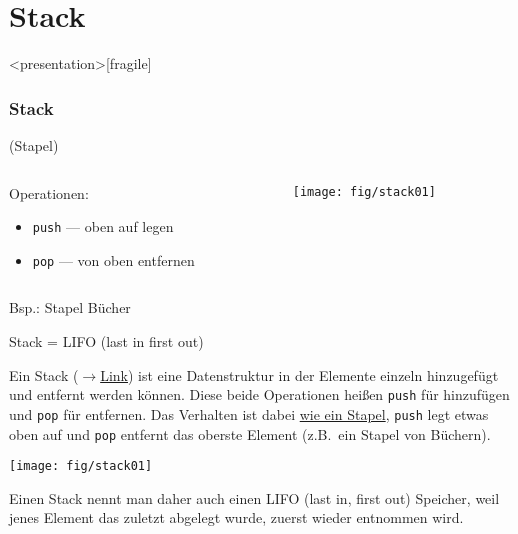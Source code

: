 \pagebreak
\section{Stack}

\begin{multicols}{2}


\begin{frame}<presentation>[fragile]
\frametitle{Stack}

(Stapel)

\begin{columns}[c]\begin{column}{0.5 \textwidth}
Operationen:
\begin{itemize}
\item \lstinline{push} --- oben auf legen
\item \lstinline{pop} --- von oben entfernen
\end{itemize}
\end{column}\begin{column}{0.5 \textwidth}
\begin{center}
\texttt{[image: fig/stack01]}
\end{center}
\end{column}\end{columns}

Bsp.: Stapel Bücher

\vfill
\begin{center}
Stack = LIFO (last in first out)
\end{center}
\end{frame}

\begin{definition}
Ein Stack 
(\href{http://de.wikipedia.org/wiki/Stapelspeicher}{$\rightarrow$Link})
ist eine Datenstruktur in der Elemente einzeln hinzugefügt und entfernt werden können.
Diese beide Operationen heißen \lstinline{push} für hinzufügen und \lstinline{pop} für entfernen.
Das Verhalten ist dabei \uline{wie ein Stapel}, \lstinline{push} legt etwas oben auf und \lstinline{pop} entfernt das oberste Element (z.B.\ ein Stapel von Büchern).
\end{definition}
\begin{center}
    \texttt{[image: fig/stack01]}
\end{center}
Einen Stack nennt man daher auch einen LIFO (last in, first out) Speicher, weil jenes Element das zuletzt abgelegt wurde, zuerst wieder entnommen wird.


\end{multicols}
